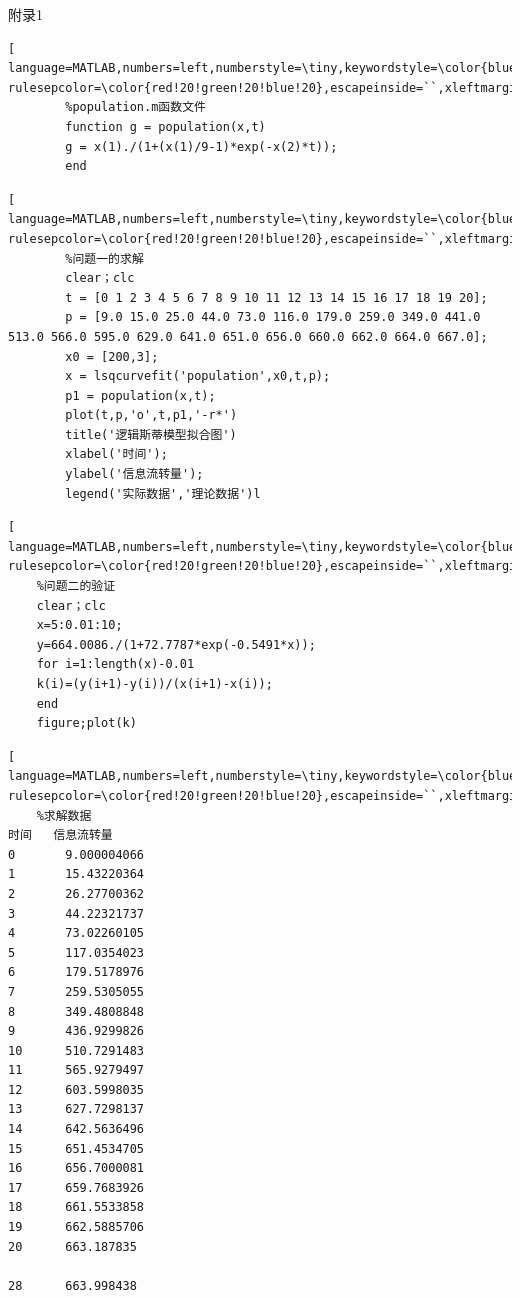 \documentclass[UTF8]{ctexart}
\begin{document}
\begin{center}
	\sihao \heiti 附录1
	
	
	\fontsize{10pt}{16pt}		\selectfont	
		\begin{lstlisting}[ language=MATLAB,numbers=left,numberstyle=\tiny,keywordstyle=\color{blue!70},commentstyle=\color{red!50!green!50!blue!50},frame=shadowbox, rulesepcolor=\color{red!20!green!20!blue!20},escapeinside=``,xleftmargin=2em,xrightmargin=2em,aboveskip=1em] 
		%population.m函数文件
		function g = population(x,t)
		g = x(1)./(1+(x(1)/9-1)*exp(-x(2)*t));  
		end		
	\end{lstlisting}
	\begin{lstlisting}[ language=MATLAB,numbers=left,numberstyle=\tiny,keywordstyle=\color{blue!70},commentstyle=\color{red!50!green!50!blue!50},frame=shadowbox, rulesepcolor=\color{red!20!green!20!blue!20},escapeinside=``,xleftmargin=2em,xrightmargin=2em,aboveskip=1em] 
		%问题一的求解
		clear；clc
		t = [0 1 2 3 4 5 6 7 8 9 10 11 12 13 14 15 16 17 18 19 20];
		p = [9.0 15.0 25.0 44.0	73.0 116.0 179.0 259.0 349.0 441.0 513.0 566.0 595.0 629.0 641.0 651.0 656.0 660.0 662.0 664.0 667.0];
		x0 = [200,3]; 
		x = lsqcurvefit('population',x0,t,p);
		p1 = population(x,t);
		plot(t,p,'o',t,p1,'-r*')
		title('逻辑斯蒂模型拟合图')
		xlabel('时间');
		ylabel('信息流转量');
		legend('实际数据','理论数据')l
	\end{lstlisting}
	\begin{lstlisting}[ language=MATLAB,numbers=left,numberstyle=\tiny,keywordstyle=\color{blue!70},commentstyle=\color{red!50!green!50!blue!50},frame=shadowbox, rulesepcolor=\color{red!20!green!20!blue!20},escapeinside=``,xleftmargin=2em,xrightmargin=2em,aboveskip=1em] 
	%问题二的验证
	clear；clc
	x=5:0.01:10;
	y=664.0086./(1+72.7787*exp(-0.5491*x));
	for i=1:length(x)-0.01
	k(i)=(y(i+1)-y(i))/(x(i+1)-x(i));
	end
	figure;plot(k)
	\end{lstlisting}	
	\begin{lstlisting}[ language=MATLAB,numbers=left,numberstyle=\tiny,keywordstyle=\color{blue!70},commentstyle=\color{red!50!green!50!blue!50},frame=shadowbox, rulesepcolor=\color{red!20!green!20!blue!20},escapeinside=``,xleftmargin=2em,xrightmargin=2em,aboveskip=1em]
	%求解数据
时间	 信息流转量
0   	9.000004066
1   	15.43220364
2   	26.27700362
3   	44.22321737
4    	73.02260105
5   	117.0354023
6    	179.5178976
7    	259.5305055
8   	349.4808848
9   	436.9299826
10   	510.7291483
11	    565.9279497
12   	603.5998035
13   	627.7298137
14	    642.5636496
15	    651.4534705
16   	656.7000081
17	    659.7683926
18	    661.5533858
19	    662.5885706
20  	663.187835

28	    663.998438
\end{lstlisting}
\end{center}
\end{document}
